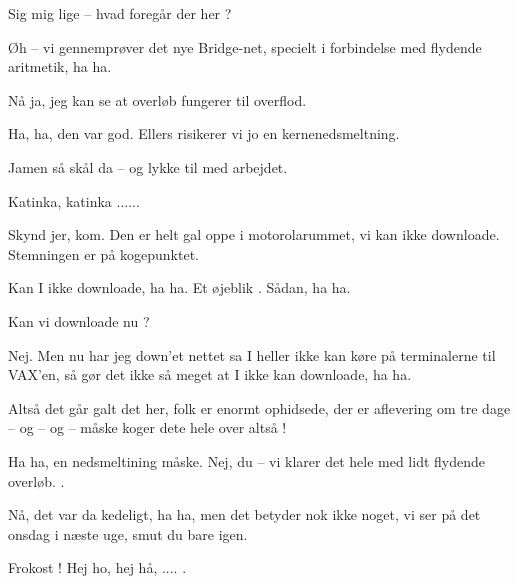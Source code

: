 \documentclass[a4paper,11pt]{article}
\begin{document}
\begin{sketch}

 Sig mig lige -- hvad foregår der her ?

 Øh -- vi gennemprøver det nye Bridge-net, specielt i forbindelse med
flydende aritmetik, ha ha.


 Nå ja, jeg kan se at overløb fungerer til overflod.

 Ha, ha, den var god.  Ellers risikerer vi jo en kernenedsmeltning.


 Jamen så skål da -- og lykke til med arbejdet. 

 Katinka, katinka ......


 Skynd jer, kom. Den er helt gal oppe i motorolarummet, vi kan ikke
downloade.  Stemningen er på kogepunktet.

 Kan I ikke downloade, ha ha.  Et øjeblik . Sådan, ha ha.

 Kan vi downloade nu ?

 Nej. Men nu har jeg down'et nettet sa I heller ikke kan køre på
terminalerne til VAX'en, så gør det ikke så meget at I ikke kan downloade, ha
ha.

 Altså det går galt det her, folk er enormt ophidsede, der er
aflevering om tre dage -- og -- og -- måske koger dete hele over altså !

 Ha ha, en nedsmeltining måske. Nej, du -- vi klarer det hele med lidt
flydende overløb. .

 Nå, det var da kedeligt, ha ha, men det betyder nok ikke noget, vi
ser på det onsdag i næste uge, smut du bare igen. 

 Frokost ! Hej ho, hej hå, .... .



\end{sketch}
\end{document}
